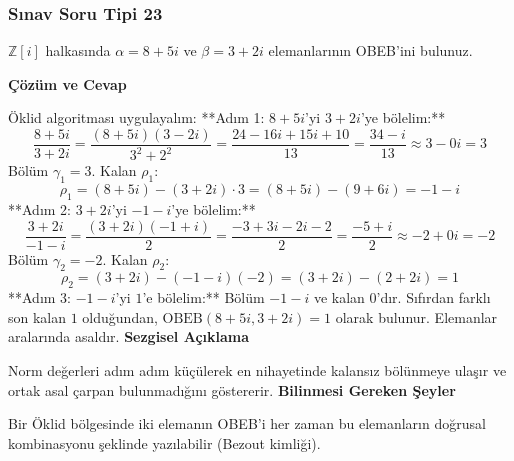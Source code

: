 \documentclass[11pt, a4paper]{article}
\newenvironment{cozum}{
    \vspace{0.5cm}
    \noindent\textcolor{green!60!black}{\faCheckCircle\enspace \textbf{\Large Çözüm ve Cevap}}\par\vspace{0.2cm}
}{}
\newenvironment{sezgisel}{
    \vspace{0.5cm}
    \noindent\textcolor{orange!80!black}{\faLightbulb\enspace \textbf{\Large Sezgisel Açıklama}}\par\vspace{0.2cm}
    \itshape
}{}
\newenvironment{bilgi}{
    \vspace{0.5cm}
    \noindent\textcolor{red!70!black}{\faExclamationTriangle\enspace \textbf{\Large Bilinmesi Gereken Şeyler}}\par\vspace{0.2cm}
}{}
\begin{document}
\subsubsection{Sınav Soru Tipi 23}
\begin{sinavbox}
$\mathbb{Z}[i]$ halkasında $\alpha = 8+5i$ ve $\beta = 3+2i$ elemanlarının OBEB'ini bulunuz.
\end{sinavbox}
\begin{cozum}
Öklid algoritması uygulayalım:
**Adım 1: $8+5i$'yi $3+2i$'ye bölelim:**
\[ \frac{8+5i}{3+2i} = \frac{(8+5i)(3-2i)}{3^2+2^2} = \frac{24 - 16i + 15i + 10}{13} = \frac{34-i}{13} \approx 3 - 0i = 3 \]
Bölüm $\gamma_1 = 3$. Kalan $\rho_1$:
\[ \rho_1 = (8+5i) - (3+2i)\cdot 3 = (8+5i) - (9+6i) = -1 - i \]
**Adım 2: $3+2i$'yi $-1-i$'ye bölelim:**
\[ \frac{3+2i}{-1-i} = \frac{(3+2i)(-1+i)}{2} = \frac{-3 + 3i - 2i - 2}{2} = \frac{-5+i}{2} \approx -2 + 0i = -2 \]
Bölüm $\gamma_2 = -2$. Kalan $\rho_2$:
\[ \rho_2 = (3+2i) - (-1-i)(-2) = (3+2i) - (2+2i) = 1 \]
**Adım 3: $-1-i$'yi $1$'e bölelim:**
Bölüm $-1-i$ ve kalan $0$'dır.
Sıfırdan farklı son kalan $1$ olduğundan, $\text{OBEB}(8+5i, 3+2i) = 1$ olarak bulunur. Elemanlar aralarında asaldır.
\end{cozum}
\begin{sezgisel}
Norm değerleri adım adım küçülerek en nihayetinde kalansız bölünmeye ulaşır ve ortak asal çarpan bulunmadığını göstererir.
\end{sezgisel}
\begin{bilgi}
Bir Öklid bölgesinde iki elemanın OBEB'i her zaman bu elemanların doğrusal kombinasyonu şeklinde yazılabilir (Bezout kimliği).
\end{bilgi}

\newpage
\end{document}
